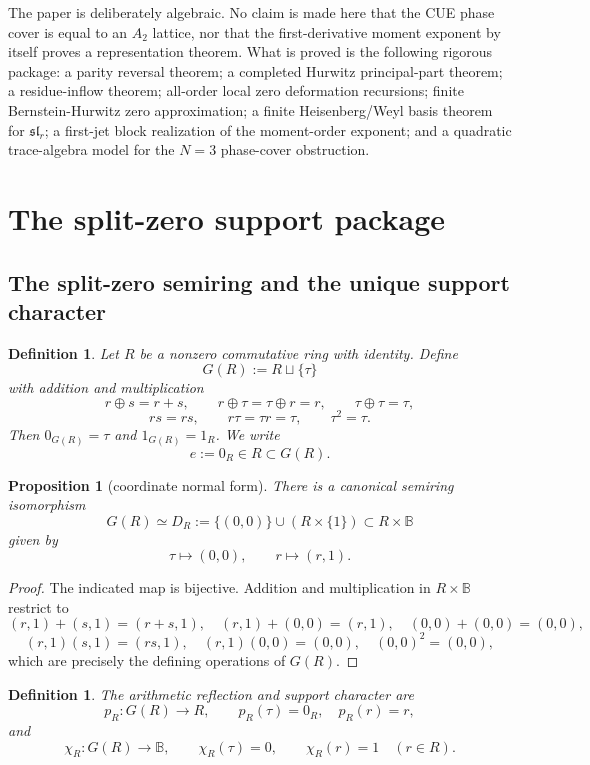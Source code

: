 \documentclass[11pt]{article}
\newtheorem{proposition}[theorem]{Proposition}
\newtheorem{definition}[theorem]{Definition}
\newcommand{\B}{\mathbb B}
\begin{document}
The paper is deliberately algebraic.  No claim is made here that the CUE phase
cover is equal to an $A_2$ lattice, nor that the first-derivative moment exponent by
itself proves a representation theorem.  What is proved is the following rigorous
package: a parity reversal theorem; a completed Hurwitz principal-part theorem;
a residue-inflow theorem; all-order local zero deformation recursions; finite
Bernstein-Hurwitz zero approximation; a finite Heisenberg/Weyl basis theorem for
$\mathfrak{sl}_r$; a first-jet block realization of the moment-order exponent; and a
quadratic trace-algebra model for the $N=3$ phase-cover obstruction.

\section{The split-zero support package}

\subsection{The split-zero semiring and the unique support character}

\begin{definition}
Let $R$ be a nonzero commutative ring with identity.  Define
\[
G(R):=R\sqcup\{\tau\}
\]
with addition and multiplication
\[
r\oplus s=r+s,\qquad r\oplus\tau=\tau\oplus r=r,\qquad \tau\oplus\tau=\tau,
\]
\[
rs=rs,
\qquad r\tau=\tau r=\tau,
\qquad \tau^2=\tau.
\]
Then $0_{G(R)}=\tau$ and $1_{G(R)}=1_R$.  We write
\[
e:=0_R\in R\subset G(R).
\]
\end{definition}

\begin{proposition}[coordinate normal form]
There is a canonical semiring isomorphism
\[
G(R)\simeq D_R:=\{(0,0)\}\cup(R\times\{1\})\subset R\times\B
\]
given by
\[
\tau\mapsto(0,0),\qquad r\mapsto(r,1).
\]
\end{proposition}

\begin{proof}
The indicated map is bijective.  Addition and multiplication in $R\times\B$ restrict
to
\[
(r,1)+(s,1)=(r+s,1),\quad (r,1)+(0,0)=(r,1),\quad (0,0)+(0,0)=(0,0),
\]
\[
(r,1)(s,1)=(rs,1),\quad (r,1)(0,0)=(0,0),\quad (0,0)^2=(0,0),
\]
which are precisely the defining operations of $G(R)$.
\end{proof}

\begin{definition}
The arithmetic reflection and support character are
\[
p_R:G(R)\to R,
\qquad p_R(\tau)=0_R,\quad p_R(r)=r,
\]
and
\[
\chi_R:G(R)\to\B,
\qquad \chi_R(\tau)=0,
\qquad \chi_R(r)=1\quad(r\in R).
\]
\end{definition}
\end{document}
